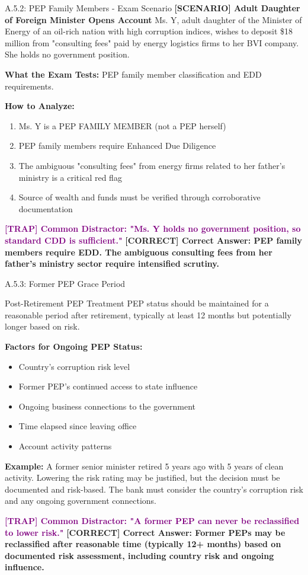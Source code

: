\documentclass[11pt,a4paper]{beamer}
\newcommand{\trap}[1]{\textcolor{purple}{\textbf{[TRAP] #1}}}
\newcommand{\correct}[1]{\textcolor{green!50!black}{\textbf{[CORRECT] #1}}}
\newcommand{\scenario}[1]{\textcolor{blue!70!black}{\textbf{[SCENARIO] #1}}}
\begin{document}
	\begin{frame}{A.5.2: PEP Family Members - Exam Scenario}
		\scenario{Adult Daughter of Foreign Minister Opens Account}
		Ms. Y, adult daughter of the Minister of Energy of an oil-rich nation with high corruption indices, wishes to deposit \$18 million from "consulting fees" paid by energy logistics firms to her BVI company. She holds no government position.
		
		\vspace{0.1cm}
		\textbf{What the Exam Tests:} PEP family member classification and EDD requirements.
		
		\vspace{0.1cm}
		\textbf{How to Analyze:}
		\begin{enumerate}
			\item Ms. Y is a PEP FAMILY MEMBER (not a PEP herself)
			\item PEP family members require Enhanced Due Diligence
			\item The ambiguous "consulting fees" from energy firms related to her father's ministry is a critical red flag
			\item Source of wealth and funds must be verified through corroborative documentation
		\end{enumerate}
		
		\trap{Common Distractor: "Ms. Y holds no government position, so standard CDD is sufficient."}
		\correct{Correct Answer: PEP family members require EDD. The ambiguous consulting fees from her father's ministry sector require intensified scrutiny.}
	\end{frame}
	
	\begin{frame}{A.5.3: Former PEP Grace Period}
		\begin{block}{Post-Retirement PEP Treatment}
			PEP status should be maintained for a reasonable period after retirement, typically at least 12 months but potentially longer based on risk.
		\end{block}
		\textbf{Factors for Ongoing PEP Status:}
		\begin{itemize}
			\item Country's corruption risk level
			\item Former PEP's continued access to state influence
			\item Ongoing business connections to the government
			\item Time elapsed since leaving office
			\item Account activity patterns
		\end{itemize}
		\textbf{Example:}
		A former senior minister retired 5 years ago with 5 years of clean activity. Lowering the risk rating may be justified, but the decision must be documented and risk-based. The bank must consider the country's corruption risk and any ongoing government connections.
		
		\trap{Common Distractor: "A former PEP can never be reclassified to lower risk."}
		\correct{Correct Answer: Former PEPs may be reclassified after reasonable time (typically 12+ months) based on documented risk assessment, including country risk and ongoing influence.}
	\end{frame}
	
\end{document}
